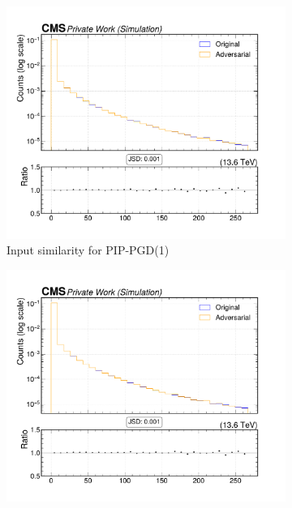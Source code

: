 \begin{figure}[htbp]
  \centering
  \begin{subfigure}[t]{0.32\textwidth}
    \includegraphics[width=\linewidth]{media/output/features/compare/combined_it_1/cmp_vtx_arr_sv_d3dsig.pdf}
    \caption*{Input similarity for PIP-PGD(1)}
  \end{subfigure}\hfill
  \begin{subfigure}[t]{0.32\textwidth}
    \includegraphics[width=\linewidth]{media/output/features/compare/combined_it_2/cmp_vtx_arr_sv_d3dsig.pdf}

\end{subfigure}
\end{figure}
